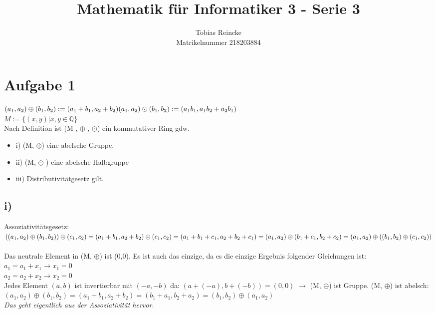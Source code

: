 \documentclass[]{article}
\title{Mathematik für Informatiker 3 - Serie 3}
\author{Tobias Reincke \\ Matrikelnummer 218203884}
\begin{document}
\maketitle


\section*{Aufgabe 1}
$(a_1 , a_2 ) \oplus (b_1 , b_2 ) := (a_1 + b_1 , a_2 + b_2 ) \\
(a_1 , a_2 ) \odot (b_1,b_2):= (a_1 b_1 , a_1 b_2 + a_2 b_1)$\\
$M :=\{(x,y) | x,y \in \mathbb{Q}\}$\\
Nach Definition ist (M , $\oplus$ , $\odot$) ein kommutativer Ring gdw. \\

\begin{itemize}
  \item{i)} (M, $\oplus$) eine abelsche Gruppe.
  
  \item{ii)} (M, $\odot$ ) eine abelsche Halbgruppe
  \item{iii)} Distributivitätgesetz gilt.
\end{itemize}



\subsection*{i)}
Assoziativitätsgesetz:\\
$ ( (a_1 , a_2 ) \oplus (b_1 , b_2 ) )  \oplus (c_1 , c_2 )   \\= (a_1 + b_1 , a_2 + b_2)\oplus (c_1 ,c _2 ) \\=(a_1 + b_1 +c_1, a_2 + b_2+c_1) \\= (a_1, a_2) \oplus (b_1 + c_1 , b_2 + c_2)\\ = (a_1, a_2) \oplus ( (b_1, b_2) \oplus (c_1, c_2) )   $ \\ \\
Das neutrale Element in (M, $\oplus$) ist (0,0). Es ist auch das einzige, da es die einzige Ergebnis folgender Gleichungen ist: \\
 $a_{1} = a_{1}+x_{1} \rightarrow x_1 = 0$\\
  $a_{2} = a_{2}+x_{2} \rightarrow x_2 = 0$\\
   Jedes Element $(a,b)$ ist invertierbar mit $(-a,-b)$ da: $(a+ (-a), b +(-b) ) = (0,0)$
   $\rightarrow$ (M, $\oplus$) ist Gruppe.
   (M, $\oplus$) ist abelsch: \\
   $(a_1 , a_2 ) \oplus (b_1 , b_2 ) = (a_1 + b_1 , a_2 + b_2 )= (b_1 + a_1 , b_2 + a_2 ) = (b_1 , b_2 ) \oplus (a_1 , a_2 ) $\\ 
   \textit{Das geht eigentlich aus der Assoziativität hervor. }
   
\end{document}
